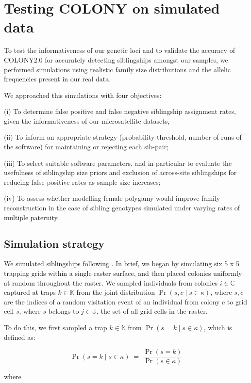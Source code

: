 \documentclass[12pt]{article}
\begin{document}
\section{Testing COLONY on simulated data}
To test the informativeness of our genetic loci and to validate the accuracy of COLONY2.0 \parencite{jonesCOLONYProgramParentage2010} for accurately detecting siblingships amongst our samples, we performed simulations using realistic family size distributions and the allelic frequencies present in our real data.

We approached this simulations with four objectives:

(i) To determine false positive and false negative siblingship assignment rates, given the informativeness of our microsatellite datasets, 

(ii) To inform an appropriate strategy (probability threshold, number of runs of the software) for maintaining or rejecting each sib-pair;

(iii) To select suitable software parameters, and in particular to evaluate the usefulness of siblingship size priors and exclusion of across-site siblingships for reducing false positive rates as sample size increases;

(iv) To assess whether modelling female polygamy would improve family reconstruction in the case of sibling genotypes simulated under varying rates of multiple paternity.

\subsection{Simulation strategy}
We simulated siblingships following \textcite{popeInferringForagingRanges2017}. In brief, we began by simulating six 5 x 5 trapping grids within a single raster surface, and then placed colonies uniformly at random throughout the raster. We sampled individuals from colonies $i \in \mathbb{C}$ captured at traps $k \in \mathbb{K}$ from the joint distribution $\Pr(s, c \mid s \in \kappa)$, where ${s,c}$ are the indices of a random visitation event of an individual from colony $c$ to grid cell $s$, where $s$ belongs to $j \in \mathbb{J}$, the set of all grid cells in the raster. 

To do this, we first sampled a trap $k \in \mathbb{K}$ from $\Pr(s=k \mid s \in \kappa)$, which is defined as:

\[
\Pr(s = k \mid s \in \kappa) \;=\; \frac{\Pr(s = k)}{\Pr(s \in \kappa)}
\]

where
\end{document}
